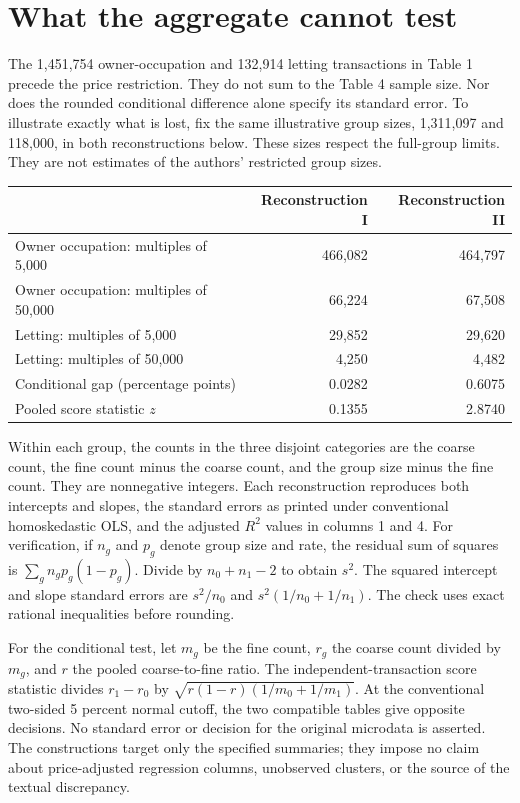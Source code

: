 \documentclass[11pt]{article}
\begin{document}
\section{What the aggregate cannot test}
The 1,451,754 owner-occupation and 132,914 letting transactions in Table 1 precede the price restriction. They do not sum to the Table 4 sample size. Nor does the rounded conditional difference alone specify its standard error. To illustrate exactly what is lost, fix the same illustrative group sizes, 1,311,097 and 118,000, in both reconstructions below. These sizes respect the full-group limits. They are not estimates of the authors' restricted group sizes.
\begin{center}
\begin{tabular}{lrr}
\toprule
& Reconstruction I & Reconstruction II\\
\midrule
Owner occupation: multiples of 5,000 & 466,082 & 464,797\\
Owner occupation: multiples of 50,000 & 66,224 & 67,508\\
Letting: multiples of 5,000 & 29,852 & 29,620\\
Letting: multiples of 50,000 & 4,250 & 4,482\\
\midrule
Conditional gap (percentage points) & 0.0282 & 0.6075\\
Pooled score statistic $z$ & 0.1355 & 2.8740\\
\bottomrule
\end{tabular}
\end{center}
Within each group, the counts in the three disjoint categories are the coarse count, the fine count minus the coarse count, and the group size minus the fine count. They are nonnegative integers. Each reconstruction reproduces both intercepts and slopes, the standard errors as printed under conventional homoskedastic OLS, and the adjusted $R^2$ values in columns 1 and 4. For verification, if $n_g$ and $p_g$ denote group size and rate, the residual sum of squares is $\sum_g n_gp_g(1-p_g)$. Divide by $n_0+n_1-2$ to obtain $s^2$. The squared intercept and slope standard errors are $s^2/n_0$ and $s^2(1/n_0+1/n_1)$. The check uses exact rational inequalities before rounding.

For the conditional test, let $m_g$ be the fine count, $r_g$ the coarse count divided by $m_g$, and $r$ the pooled coarse-to-fine ratio. The independent-transaction score statistic divides $r_1-r_0$ by $\sqrt{r(1-r)(1/m_0+1/m_1)}$. At the conventional two-sided 5 percent normal cutoff, the two compatible tables give opposite decisions. No standard error or decision for the original microdata is asserted. The constructions target only the specified summaries; they impose no claim about price-adjusted regression columns, unobserved clusters, or the source of the textual discrepancy.
\end{document}
